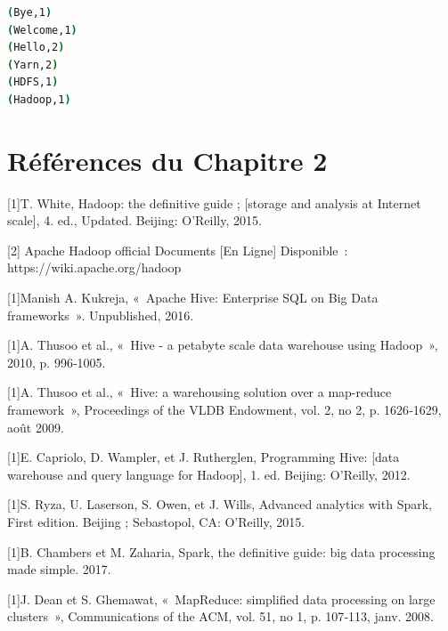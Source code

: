 \documentclass[12pt,english]{book}
\begin{document}
\begin{lstlisting}[language=bash, frame=single]
(Bye,1)
(Welcome,1)
(Hello,2)
(Yarn,2)
(HDFS,1)
(Hadoop,1)
\end{lstlisting}


\section{Références du Chapitre 2}


[1]T. White, Hadoop: the definitive guide ; [storage and analysis at Internet scale], 4. ed., Updated. Beijing: O'Reilly, 2015.

[2] Apache Hadoop official Documents [En Ligne] Disponible : https://wiki.apache.org/hadoop

[1]Manish A. Kukreja, « Apache Hive: Enterprise SQL on Big Data frameworks ». Unpublished, 2016.

[1]A. Thusoo et al., « Hive - a petabyte scale data warehouse using Hadoop », 2010, p. 996‑1005.

[1]A. Thusoo et al., « Hive: a warehousing solution over a map-reduce framework », Proceedings of the VLDB Endowment, vol. 2, no 2, p. 1626‑1629, août 2009.

[1]E. Capriolo, D. Wampler, et J. Rutherglen, Programming Hive: [data warehouse and query language for Hadoop], 1. ed. Beijing: O'Reilly, 2012.

[1]S. Ryza, U. Laserson, S. Owen, et J. Wills, Advanced analytics with Spark, First edition. Beijing ; Sebastopol, CA: O'Reilly, 2015.

[1]B. Chambers et M. Zaharia, Spark,  the definitive guide: big data processing made simple. 2017.

[1]J. Dean et S. Ghemawat, « MapReduce: simplified data processing on large clusters », Communications of the ACM, vol. 51, no 1, p. 107‑113, janv. 2008.
\end{document}
